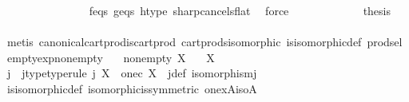 \begin{isabellebody}
\ \ \ \ \ \ \ \ \ \ \ \ \ \ \isamarkupfalse%
\ f{\isacharunderscore}{\kern0pt}eqs\ g{\isacharunderscore}{\kern0pt}eqs\ h{\isacharunderscore}{\kern0pt}type\ sharp{\isacharunderscore}{\kern0pt}cancels{\isacharunderscore}{\kern0pt}flat\ \isamarkupfalse%
\ force\isanewline
\ \ \ \ \isamarkupfalse%
\isanewline
\ \ \isamarkupfalse%
\isanewline
\ \ \isamarkupfalse%
\ \isamarkupfalse%
\ {\isacharquery}{\kern0pt}thesis\isanewline
\ \ \ \ \isamarkupfalse%
\ {\isacharparenleft}{\kern0pt}metis\ canonical{\isacharunderscore}{\kern0pt}cart{\isacharunderscore}{\kern0pt}prod{\isacharunderscore}{\kern0pt}is{\isacharunderscore}{\kern0pt}cart{\isacharunderscore}{\kern0pt}prod\ cart{\isacharunderscore}{\kern0pt}prods{\isacharunderscore}{\kern0pt}isomorphic\ is{\isacharunderscore}{\kern0pt}isomorphic{\isacharunderscore}{\kern0pt}def\ prod{\isachardot}{\kern0pt}sel{\isacharparenleft}{\kern0pt}{}{\isacharcomma}{\kern0pt}{}{\isacharparenright}{\kern0pt}{\isacharparenright}{\kern0pt}\isanewline
{}\isamarkupfalse%
%
\endisatagproof
{\isafoldproof}%
%
\isadelimproof
\isanewline
%
\endisadelimproof
\isanewline
{}\isamarkupfalse%
\ empty{\isacharunderscore}{\kern0pt}exp{\isacharunderscore}{\kern0pt}nonempty{\isacharcolon}{\kern0pt}\isanewline
\ \ \ {\isachardoublequoteopen}nonempty\ X{\isachardoublequoteclose}\isanewline
\ \ \ {\isachardoublequoteopen}{\isasymemptyset}\isactrlbsup X\isactrlesup \ {\isasymcong}\ {\isasymemptyset}{\isachardoublequoteclose}\isanewline
%
\isadelimproof
%
\endisadelimproof
%
\isatagproof
{}\isamarkupfalse%
{\isacharminus}{\kern0pt}\isanewline
\ \ \isamarkupfalse%
\ j\ \ j{\isacharunderscore}{\kern0pt}type{\isacharbrackleft}{\kern0pt}type{\isacharunderscore}{\kern0pt}rule{\isacharbrackright}{\kern0pt}{\isacharcolon}{\kern0pt}\ {\isachardoublequoteopen}j{\isacharcolon}{\kern0pt}\ {\isasymemptyset}\isactrlbsup X\isactrlesup \ {\isasymrightarrow}\ one{\isasymtimes}\isactrlsub c\ {\isasymemptyset}\isactrlbsup X\isactrlesup {\isachardoublequoteclose}\ \ j{\isacharunderscore}{\kern0pt}def{\isacharcolon}{\kern0pt}\ {\isachardoublequoteopen}isomorphism{\isacharparenleft}{\kern0pt}j{\isacharparenright}{\kern0pt}{\isachardoublequoteclose}\isanewline
\ \ \ \ \isamarkupfalse%
\ is{\isacharunderscore}{\kern0pt}isomorphic{\isacharunderscore}{\kern0pt}def\ isomorphic{\isacharunderscore}{\kern0pt}is{\isacharunderscore}{\kern0pt}symmetric\ one{\isacharunderscore}{\kern0pt}x{\isacharunderscore}{\kern0pt}A{\isacharunderscore}{\kern0pt}iso{\isacharunderscore}{\kern0pt}A\ \isamarkupfalse%

\end{isabellebody}
